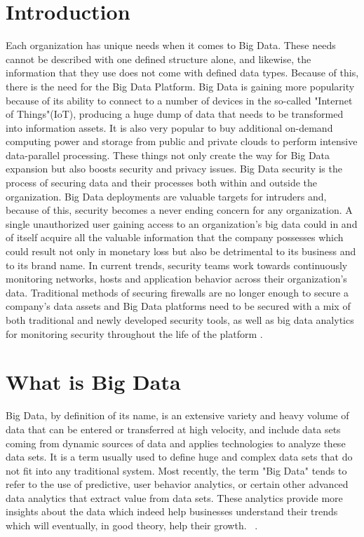 \documentclass[sigconf]{acmart}
\begin{document}
\section{Introduction}
Each organization has unique needs when it comes to Big Data.  These needs cannot be described with one defined structure alone, and likewise, the information that they use does not come with defined data types.  Because of this, there is the need for the Big Data Platform. Big Data is gaining more popularity because of its ability to connect to a number of devices in the so-called "Internet of Things"(IoT),  producing a huge dump of data that needs to be transformed into information assets. It is also very popular to buy additional on-demand computing power and storage from public and private clouds to perform intensive data-parallel processing. These things not only create the way for Big Data expansion but also boosts security and privacy issues. Big Data security is the process of securing data and their processes both within and outside the organization. Big Data deployments are valuable targets for intruders and, because of this, security becomes a never ending concern for any organization. A single unauthorized user gaining access to an  organization's big data could in and of itself acquire all the valuable information that the company possesses which could result not only in monetary loss but also be detrimental to its business and to its brand name. In current trends, security teams work towards continuously monitoring networks, hosts and application behavior across their organization's data. Traditional methods of securing firewalls are no longer enough to secure a company's data assets and Big Data platforms need to be secured with a mix of both traditional and newly developed security tools, as well as big data analytics for monitoring security throughout the life of the platform \cite{moura2016}.

\section{What is Big Data}
Big Data, by definition of its name, is an extensive variety and heavy volume of data that can be entered or transferred at high velocity, and include data sets coming from dynamic sources of data and applies technologies to analyze these data sets. It is a term usually used to define huge and complex data sets that do not fit into any traditional system. Most recently, the term "Big Data" tends to refer to the use of predictive, user behavior analytics, or certain other advanced data analytics that extract value from data sets. These analytics provide more insights about the data which indeed help businesses understand their trends which will eventually, in good theory, help their growth. ~\cite{hey2009fourth}.
\end{document}
